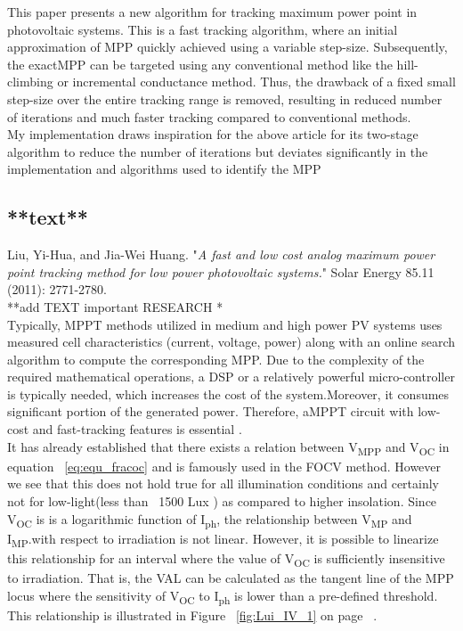 This paper presents a new algorithm for tracking maximum power point in photovoltaic systems. This is a fast tracking algorithm, where an initial approximation of \ac{MPP} quickly achieved using a variable step-size. Subsequently, the exact\ac{MPP} can be targeted using any conventional method like the hill-climbing or incremental conductance method. Thus, the drawback of a fixed small step-size over the entire tracking range is removed, resulting in reduced number of iterations and much faster tracking compared to conventional methods. \\

My implementation draws inspiration for the above article for its  two-stage algorithm to reduce the number of iterations but deviates significantly in the implementation and algorithms used to identify the \ac{MPP} 

\subsection{**text**\cite{liu2011fast}}

Liu, Yi-Hua, and Jia-Wei Huang. "\textit{A fast and low cost analog maximum power point tracking method for low power photovoltaic systems.}" Solar Energy 85.11 (2011): 2771-2780.\\

**add TEXT important RESEARCH * \\

Typically, MPPT methods utilized in medium and high power PV systems uses measured cell characteristics (current, voltage, power) along with an online search algorithm to compute the corresponding \ac{MPP}. Due to the complexity of the required mathematical operations, a \ac{DSP} or a relatively powerful micro-controller is typically needed, which increases the cost of the system.Moreover, it consumes significant portion of the generated power. Therefore, a\ac{MPPT} circuit with low-cost and fast-tracking features is essential .\\

It has already established that there exists a relation between V\textsubscript{MPP} and V\textsubscript{OC} in equation ~\ref{eq:equ_fracoc} and is famously used in the \ac{FOCV} method. However we see that this does not hold true for all illumination conditions and certainly not for low-light(less than ~1500 Lux ) as compared to higher insolation. Since V\textsubscript{OC} is is a logarithmic function of I\textsubscript{ph}, the relationship between  V\textsubscript{MP} and I\textsubscript{MP}.with respect to irradiation is not linear. However, it is possible to linearize this relationship for an interval where the value of V\textsubscript{OC} is sufficiently insensitive to irradiation. That is, the  \ac{VAL} can be calculated as the tangent line of the \ac{MPP} locus where the sensitivity of V\textsubscript{OC} to I\textsubscript{ph} is lower than a pre-defined threshold. This relationship is illustrated in Figure ~\ref{fig:Lui_IV_1} on page ~\pageref{fig:Lui_IV_1}.


